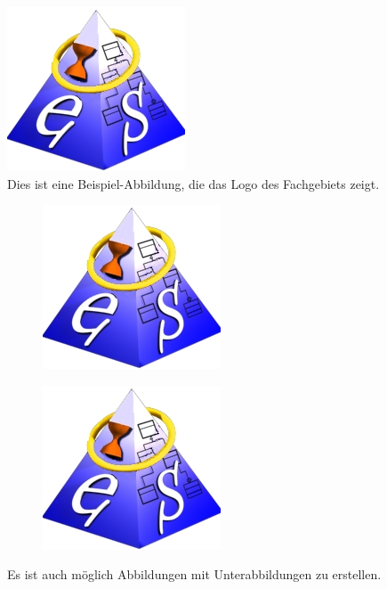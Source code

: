 \begin{figure}
    \centering
    \includegraphics[width=.3\linewidth]{figures/es_logo_gross.jpg}
    \caption{Dies ist eine Beispiel-Abbildung, die das Logo des Fachgebiets zeigt.}\label{fig:some-figure}
\end{figure}

\begin{figure}
    \centering
    \begin{subfigure}[b]{0.48\textwidth}
	\centering
        \includegraphics[width=.4\linewidth]{figures/es_logo_gross.jpg}
    \end{subfigure}
    \begin{subfigure}[b]{0.48\textwidth}
        \centering
        \includegraphics[width=.4\linewidth]{figures/es_logo_gross.jpg}
    \end{subfigure}
    \caption{Es ist auch möglich Abbildungen mit Unterabbildungen zu erstellen.}\label{fig:some-sub-figure}
\end{figure}


